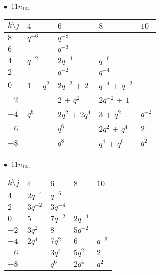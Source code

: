 \begin{minipage}{\linewidth}
$\bullet\ $ $11n_{104}$ \vspace{0.5em} \\
\begin{tabular}{l|llll}
$k \setminus j$ & $4$ & $6$ & $8$ & $10$ \\
\hline
$8$ & $q^{-6}$ & $q^{-8}$ &  &  \\
$6$ &  & $q^{-6}$ &  &  \\
$4$ & $q^{-2}$ & $2q^{-4}$ & $q^{-6}$ &  \\
$2$ &  & $q^{-2}$ & $q^{-4}$ &  \\
$0$ & $1$ + $q^{2}$ & $2q^{-2}$ + $2$ & $q^{-4}$ + $q^{-2}$ &  \\
$-2$ &  & $2$ + $q^{2}$ & $2q^{-2}$ + $1$ &  \\
$-4$ & $q^{6}$ & $2q^{2}$ + $2q^{4}$ & $3$ + $q^{2}$ & $q^{-2}$ \\
$-6$ &  & $q^{6}$ & $2q^{2}$ + $q^{4}$ & $2$ \\
$-8$ &  & $q^{8}$ & $q^{4}$ + $q^{6}$ & $q^{2}$ \\
\end{tabular}
\vspace{2em}
\end{minipage}
%
\begin{minipage}{\linewidth}
$\bullet\ $ $11n_{105}$ \vspace{0.5em} \\
\begin{tabular}{l|llll}
$k \setminus j$ & $4$ & $6$ & $8$ & $10$ \\
\hline
$4$ & $2q^{-4}$ & $q^{-6}$ &  &  \\
$2$ & $3q^{-2}$ & $3q^{-4}$ &  &  \\
$0$ & $5$ & $7q^{-2}$ & $2q^{-4}$ &  \\
$-2$ & $3q^{2}$ & $8$ & $5q^{-2}$ &  \\
$-4$ & $2q^{4}$ & $7q^{2}$ & $6$ & $q^{-2}$ \\
$-6$ &  & $3q^{4}$ & $5q^{2}$ & $2$ \\
$-8$ &  & $q^{6}$ & $2q^{4}$ & $q^{2}$ \\
\end{tabular}
\vspace{2em}
\end{minipage}
%

